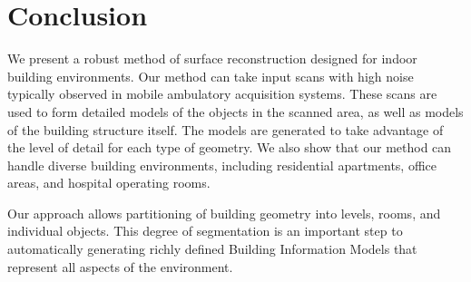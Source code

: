 \documentclass[review]{acmsiggraph}
\begin{document}
\section{Conclusion}
\label{sec:conclusion}

We present a robust method of surface reconstruction designed for indoor building environments.  Our method can take input scans with high noise typically observed in mobile ambulatory acquisition systems.  These scans are used to form detailed models of the objects in the scanned area, as well as models of the building structure itself.  The models are generated to take advantage of the level of detail for each type of geometry.  We also show that our method can handle diverse building environments, including residential apartments, office areas, and hospital operating rooms.

Our approach allows partitioning of building geometry into levels, rooms, and individual objects.  This degree of segmentation is an important step to automatically generating richly defined Building Information Models that represent all aspects of the environment. 





\end{document}

